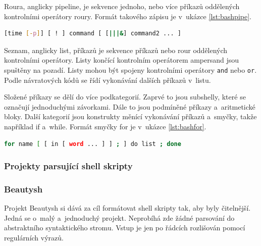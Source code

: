 \documentclass[thesis=M,czech]{FITthesis}[2012/06/26]
\begin{document}
Roura, anglicky pipeline, je sekvence jednoho, nebo více příkazů oddělených kontrolními operátory roury. Formát takového zápisu je v~ukázce \ref{lst:bashpipe}.

\noindent
\begin{minipage}{\linewidth}
\begin{lstlisting}[language=bash, caption={Formát roury v~Bashi}, label={lst:bashpipe}]
[time [-p]] [ ! ] command [ [|||&] command2 ... ]
\end{lstlisting}
\end{minipage}

Seznam, anglicky list, 	příkazů je sekvence příkazů nebo rour oddělených kontrolními operátory. Listy končící kontrolním operátorem ampersand jsou spuštěny na pozadí. Listy mohou být spojeny kontrolními operátory \texttt{and} nebo \texttt{or}. Podle návratových kódů se řídí vykonávání dalších příkazů v~listu.

Složené příkazy se dělí do více podkategorií. Zaprvé to jsou subshelly, které se označují jednoduchými závorkami. Dále to jsou podmíněné příkazy a~aritmetické bloky. Další kategorií jsou konstrukty měnící vykonávání příkazů a~smyčky, takže například if a~while. Formát smyčky for je v~ukázce \ref{lst:bashfor}.

\noindent
\begin{minipage}{\linewidth}
\begin{lstlisting}[language=bash, caption={Formát jedné varianty cyklu for v~Bashi}, label={lst:bashfor}]
for name [ [ in [ word ... ] ] ; ] do list ; done
\end{lstlisting}
\end{minipage}




\subsubsection{Projekty parsující shell skripty}

%
\subsubsection{Beautysh}

Projekt Beautysh \cite{beautysh} si dává za cíl formátovat shell skripty tak, aby byly čitelnější. Jedná se o~malý a~jednoduchý projekt. Neprobíhá zde žádné parsování do abstraktního syntaktického stromu. Vstup je jen po řádcích rozlišován pomocí regulárních výrazů.
\end{document}
